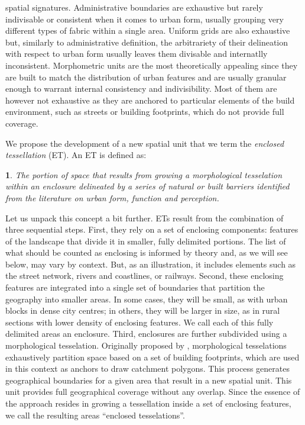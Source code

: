 spatial signatures.
%
Administrative boundaries are exhaustive but rarely indivisable or consistent
when it comes to urban form, usually grouping very different types of fabric
within a single area.
%
Uniform grids are also exhaustive but, similarly to administrative definition,
the arbitrariety of their delineation with respect to urban form usually
leaves them divisable and internatlly inconsistent.
%
Morphometric units are the most theoretically appealing since they are built
to match the distribution of urban features and are usually granular enough to
warrant internal consistency and indivisibility. Most of them are however not
exhaustive as they are anchored to particular elements of the build
environment, such as streets or building footprints, which do not provide full
coverage.

We propose the development of a new spatial unit that we term the
\textit{enclosed tessellation} (ET).
An ET is defined as:
\newtheorem*{theorem}{}
\begin{theorem}
        The portion of space that results from growing a
morphological tesselation within an
enclosure delineated by a series of natural or built barriers identified from the
literature on urban form, function and perception.
\end{theorem}
Let us unpack this concept a bit further. ETs result from the combination of
three sequential steps.
First, they rely on a set of enclosing
components: features of the landscape that divide it in smaller,
fully delimited portions. The list of what should be counted as enclosing is
informed by theory and, as we will see below, may vary by context. But, as an
illustration, it includes elements such as the street network, rivers and
coastlines, or railways.
Second, these enclosing features are integrated into a single set of
boundaries that partition the geography into smaller areas. In some cases,
they will be small, as with urban blocks in dense city
centres; in others, they will be larger in size, as in rural sections with
lower density of enclosing features. We call each of this fully delimited
areas an enclosure.
Third, enclosures are further subdivided using a morphological tesselation.
Originally proposed by \citep{fleischmann2020morphological}, morphological
tesselations exhaustively partition space based on a set of building
footprints, which are used in this context as anchors to draw catchment
polygons.
This process generates geographical boundaries for a given area that
result in a new spatial unit. This unit provides full geographical coverage
without any overlap.
%
Since the essence of the approach resides in growing a tessellation inside a
set of enclosing features, we call the resulting areas ``enclosed
tesselations''.

